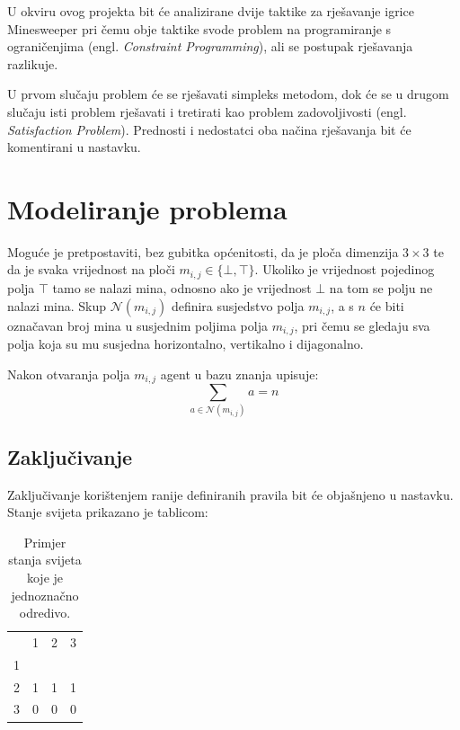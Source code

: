 \documentclass{article}
\numberwithin{figure}{section}
\numberwithin{table}{section}
\begin{document}
U okviru ovog projekta bit će analizirane dvije taktike za rješavanje igrice Minesweeper pri čemu obje
taktike svode problem na programiranje s ograničenjima (engl. \textit{Constraint Programming}),
ali se postupak rješavanja razlikuje.

U prvom slučaju problem će se rješavati simpleks metodom, dok će se u drugom slučaju isti
problem rješavati i tretirati kao problem zadovoljivosti (engl. \textit{Satisfaction Problem}).
Prednosti i nedostatci oba načina rješavanja bit će komentirani u nastavku.

\section{Modeliranje problema}

Moguće je pretpostaviti, bez gubitka općenitosti, da je ploča dimenzija $3 \times 3$ te da je
svaka vrijednost na ploči $m_{i, j} \in \{\bot, \top\}$. Ukoliko je vrijednost pojedinog polja
$\top$ tamo se nalazi mina, odnosno ako je vrijednost $\bot$ na tom se polju ne nalazi mina.
Skup $\mathcal{N}(m_{i, j})$ definira susjedstvo polja $m_{i, j}$, a s $n$ će biti označavan broj mina
u susjednim poljima polja $m_{i, j}$, pri čemu se gledaju sva polja koja su mu susjedna horizontalno, vertikalno i dijagonalno.

Nakon otvaranja polja $m_{i, j}$ agent u bazu znanja upisuje:
\begin{equation}
    \sum_{a \in \mathcal{N}(m_{i, j})} a = n
    \label{eq:1}
\end{equation}

\subsection{Zaključivanje}
Zaključivanje korištenjem ranije definiranih pravila bit će objašnjeno u nastavku. Stanje
svijeta prikazano je tablicom:

\begin{table}[ht]
    \centering
    \begin{tabular}{llll}
                           & 1                      & 2                      & 3                      \\ \cline{2-4}
    \multicolumn{1}{l|}{1} & \multicolumn{1}{l|}{}  & \multicolumn{1}{l|}{}  & \multicolumn{1}{l|}{}  \\ \cline{2-4}
    \multicolumn{1}{l|}{2} & \multicolumn{1}{l|}{1} & \multicolumn{1}{l|}{1} & \multicolumn{1}{l|}{1} \\ \cline{2-4}
    \multicolumn{1}{l|}{3} & \multicolumn{1}{l|}{0} & \multicolumn{1}{l|}{0} & \multicolumn{1}{l|}{0}  \\ \cline{2-4}
    \end{tabular}
    \label{table:state1}
    \caption{Primjer stanja svijeta koje je jednoznačno odredivo.}
\end{table}
\end{document}
